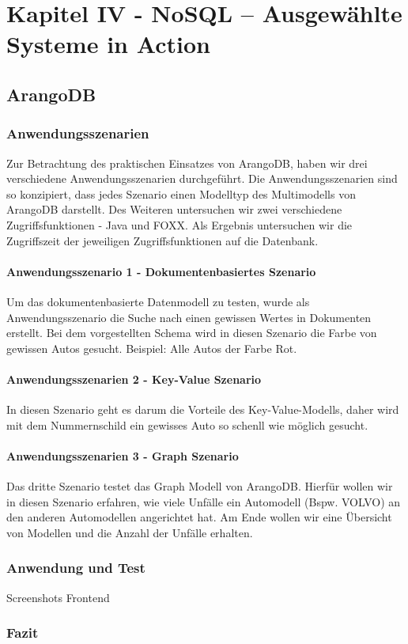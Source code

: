 \chapter{Kapitel IV - NoSQL – Ausgewählte Systeme in Action}
\section{ArangoDB}
\subsection{Anwendungsszenarien}
Zur Betrachtung des praktischen Einsatzes von ArangoDB, haben wir drei verschiedene Anwendungsszenarien durchgeführt. Die Anwendungsszenarien sind so konzipiert, dass jedes Szenario einen Modelltyp des Multimodells von ArangoDB darstellt. Des Weiteren untersuchen wir zwei verschiedene Zugriffsfunktionen - Java und FOXX. Als Ergebnis untersuchen wir die Zugriffszeit der jeweiligen Zugriffsfunktionen auf die Datenbank.
\subsubsection{Anwendungsszenario 1 - Dokumentenbasiertes Szenario}
Um das dokumentenbasierte Datenmodell zu testen, wurde als Anwendungsszenario die Suche nach einen gewissen Wertes in Dokumenten erstellt. Bei dem vorgestellten Schema wird in diesen Szenario die Farbe von gewissen Autos gesucht. Beispiel: Alle Autos der Farbe Rot.
\subsubsection{Anwendungsszenarien 2 - Key-Value Szenario}
In diesen Szenario geht es darum die Vorteile des Key-Value-Modells, daher wird mit dem Nummernschild ein gewisses Auto so schenll wie möglich gesucht.
\subsubsection{Anwendungsszenarien 3 - Graph Szenario}
Das dritte Szenario testet das Graph Modell von ArangoDB. Hierfür wollen wir in diesen Szenario erfahren, wie viele Unfälle ein Automodell (Bspw. VOLVO) an den anderen Automodellen angerichtet hat. Am Ende wollen wir eine Übersicht von Modellen und die Anzahl der Unfälle erhalten.


\subsection{Anwendung und Test}
Screenshots Frontend 
\subsection{Fazit}